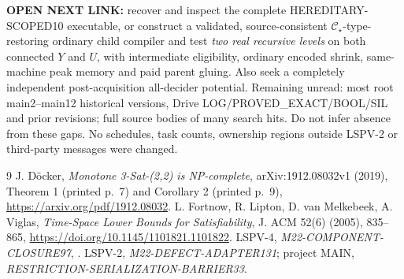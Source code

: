 \documentclass[11pt]{article}
\newcommand{\Cs}{\mathcal C_\star}
\begin{document}
\noindent \textbf{OPEN NEXT LINK:} recover and inspect the complete HEREDITARY-SCOPED10 executable, or construct a validated, source-consistent \(\Cs\)-type-restoring ordinary child compiler and test \emph{two real recursive levels} on both connected \(Y\) and \(U\), with intermediate eligibility, ordinary encoded shrink, same-machine peak memory and paid parent gluing. Also seek a completely independent post-acquisition all-decider potential. Remaining unread: most root main2--main12 historical versions, Drive LOG/PROVED\_EXACT/BOOL/SIL and prior revisions; full source bodies of many search hits. Do not infer absence from these gaps. No schedules, task counts, ownership regions outside LSPV-2 or third-party messages were changed.

\begin{thebibliography}{9}
 J. D\"ocker, \emph{Monotone 3-Sat-(2,2) is NP-complete}, arXiv:1912.08032v1 (2019), Theorem 1 (printed p.~7) and Corollary 2 (printed p.~9), \url{https://arxiv.org/pdf/1912.08032}.
 L. Fortnow, R. Lipton, D. van Melkebeek, A. Viglas, \emph{Time-Space Lower Bounds for Satisfiability}, J. ACM 52(6) (2005), 835--865, \url{https://doi.org/10.1145/1101821.1101822}.
 LSPV-4, \emph{M22-COMPONENT-CLOSURE97}, .
 LSPV-2, \emph{M22-DEFECT-ADAPTER131}; project MAIN, \emph{RESTRICTION-SERIALIZATION-BARRIER33}.
\end{thebibliography}
\end{document}
